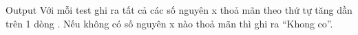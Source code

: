 Output
Với mỗi test ghi ra tất cả các số nguyên x thoả mãn theo thứ tự tăng dần trên 1 dòng . Nếu không có số nguyên x nào thoả mãn thì ghi ra “Khong co”.